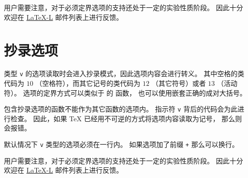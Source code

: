 \documentclass{l3doc}
\begin{document}
%
用户需要注意，对于必须定界选项的支持还处于一定的实验性质阶段。
因此十分欢迎在 \href{http://news.gmane.org/group/gmane.comp.tex.latex.latex3}{LaTeX-L} 邮件列表上进行反馈。

%
\section{抄录选项}

%
类型 \texttt{v} 的选项读取时会进入抄录模式，因此选项内容会进行转义。
其中空格的类代码为 $10$ （空格符），而其它记号的类代码为 $12$ （其它符号）或者 $13$ （活动符）。
选项的定界方式可以类似于 \LaTeXe{} 的  函数，
也可以使用嵌套正确的成对大括号。

%
包含抄录选项的函数不能作为其它函数的选项内。
指示符 \texttt{v} 背后的代码会为此进行检查。
因此，如果 \TeX{} 已经用不可逆的方式将选项内容读取为记号，
那么则会报错。

%
默认情况下 \texttt{v} 类型的选项必须在一行内。
如果选项加了前缀 \texttt{+} 那么可以换行。

%
用户需要注意，对于必须定界选项的支持还处于一定的实验性质阶段。
因此十分欢迎在 \href{http://news.gmane.org/group/gmane.comp.tex.latex.latex3}{LaTeX-L} 邮件列表上进行反馈。
\end{document}
